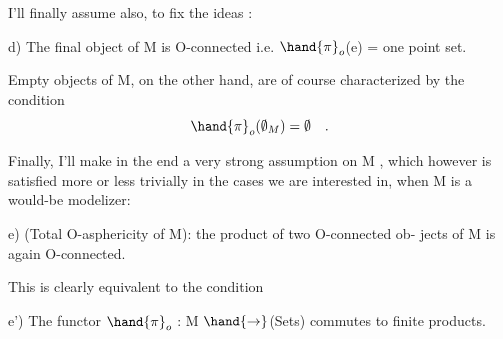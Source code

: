 I'll finally assume also,  to fix the ideas :

d)  The final object of M is O-connected i.e. $\hand{\pi}_o$(e) = one point set.

Empty objects of M, on the other hand,  are of course characterized
by the condition
\[ \hand{\pi}_o(\emptyset_M) = \emptyset \quad . \]

Finally,  I'll make in the end a very strong assumption on M , which
however is satisfied more or less trivially in the cases we are interested
in,  when M is a would-be modelizer:

e)  (Total O-asphericity of M):  the product of two O-connected ob-%
jects of M is again O-connected.

This is clearly equivalent to the condition

e')  The functor $\hand{\pi}_o$ : M $\hand{\to}$(Sets)  commutes to finite products.

